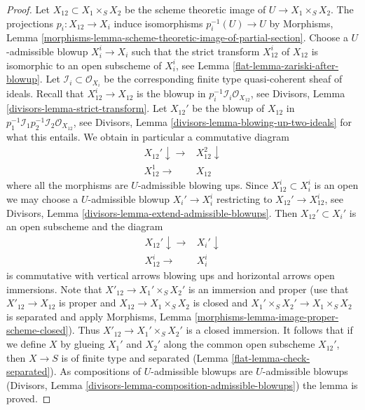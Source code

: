 \begin{proof}
\medskip\noindent
Let $X_{12} \subset X_1 \times_S X_2$ be the scheme theoretic image
of $U \to X_1 \times_S X_2$. The projections $p_i : X_{12} \to X_i$
induce isomorphisms $p_i^{-1}(U) \to U$ by
Morphisms, Lemma
\ref{morphisms-lemma-scheme-theoretic-image-of-partial-section}.
Choose a $U$-admissible blowup $X_i^i \to X_i$ such that
the strict transform $X_{12}^i$ of $X_{12}$ is isomorphic to an
open subscheme of $X_i^i$, see
Lemma \ref{flat-lemma-zariski-after-blowup}.
Let $\mathcal{I}_i \subset \mathcal{O}_{X_i}$ be the corresponding
finite type quasi-coherent sheaf of ideals.
Recall that $X_{12}^i \to X_{12}$ is the blowup in
$p_i^{-1}\mathcal{I}_i \mathcal{O}_{X_{12}}$, see
Divisors, Lemma \ref{divisors-lemma-strict-transform}.
Let $X_{12}'$ be the blowup of $X_{12}$ in
$p_1^{-1}\mathcal{I}_1 p_2^{-1}\mathcal{I}_2 \mathcal{O}_{X_{12}}$, see
Divisors, Lemma \ref{divisors-lemma-blowing-up-two-ideals}
for what this entails. We obtain in particular a commutative diagram
$$
\begin{array}{cc}X_{12}' \downarrow\longrightarrow & X_{12}^2 \downarrow \\ X_{12}^1 \longrightarrow & X_{12}\end{array}
$$
where all the morphisms are $U$-admissible blowing ups.
Since $X_{12}^i \subset X_i^i$ is an open we may choose a $U$-admissible blowup
$X_i' \to X_i^i$ restricting to $X_{12}' \to X_{12}^i$, see
Divisors, Lemma \ref{divisors-lemma-extend-admissible-blowups}.
Then $X_{12}' \subset X_i'$ is an open subscheme and the diagram
$$
\begin{array}{cc}X_{12}' \downarrow\longrightarrow & X_i' \downarrow \\ X_{12}^i \longrightarrow & X_i^i\end{array}
$$
is commutative with vertical arrows blowing ups and horizontal arrows
open immersions. Note that $X'_{12} \to X_1' \times_S X_2'$ is
an immersion and proper (use that $X'_{12} \to X_{12}$ is proper
and $X_{12} \to X_1 \times_S X_2$ is closed and $X_1' \times_S X_2' \to
X_1 \times_S X_2$ is separated and apply Morphisms, Lemma
\ref{morphisms-lemma-image-proper-scheme-closed}).
Thus $X'_{12} \to  X_1' \times_S X_2'$ is a closed immersion.
It follows that if we define $X$ by glueing $X_1'$ and $X_2'$
along the common open subscheme $X_{12}'$, then $X \to S$ is of finite type
and separated (Lemma \ref{flat-lemma-check-separated}).
As compositions of $U$-admissible blowups are $U$-admissible blowups
(Divisors, Lemma \ref{divisors-lemma-composition-admissible-blowups})
the lemma is proved.
\end{proof}


